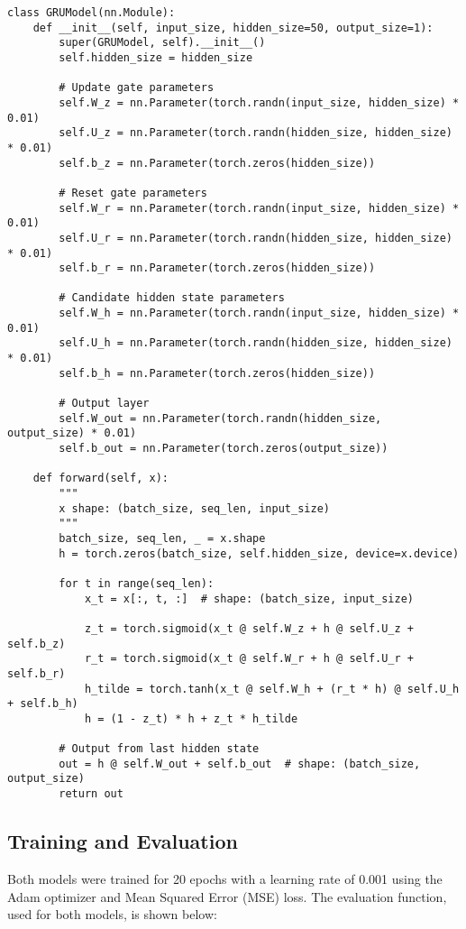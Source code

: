 \documentclass{article}
\begin{document}
\begin{lstlisting}
class GRUModel(nn.Module):
    def __init__(self, input_size, hidden_size=50, output_size=1):
        super(GRUModel, self).__init__()
        self.hidden_size = hidden_size

        # Update gate parameters
        self.W_z = nn.Parameter(torch.randn(input_size, hidden_size) * 0.01)
        self.U_z = nn.Parameter(torch.randn(hidden_size, hidden_size) * 0.01)
        self.b_z = nn.Parameter(torch.zeros(hidden_size))

        # Reset gate parameters
        self.W_r = nn.Parameter(torch.randn(input_size, hidden_size) * 0.01)
        self.U_r = nn.Parameter(torch.randn(hidden_size, hidden_size) * 0.01)
        self.b_r = nn.Parameter(torch.zeros(hidden_size))

        # Candidate hidden state parameters
        self.W_h = nn.Parameter(torch.randn(input_size, hidden_size) * 0.01)
        self.U_h = nn.Parameter(torch.randn(hidden_size, hidden_size) * 0.01)
        self.b_h = nn.Parameter(torch.zeros(hidden_size))

        # Output layer
        self.W_out = nn.Parameter(torch.randn(hidden_size, output_size) * 0.01)
        self.b_out = nn.Parameter(torch.zeros(output_size))

    def forward(self, x):
        """
        x shape: (batch_size, seq_len, input_size)
        """
        batch_size, seq_len, _ = x.shape
        h = torch.zeros(batch_size, self.hidden_size, device=x.device)

        for t in range(seq_len):
            x_t = x[:, t, :]  # shape: (batch_size, input_size)

            z_t = torch.sigmoid(x_t @ self.W_z + h @ self.U_z + self.b_z)
            r_t = torch.sigmoid(x_t @ self.W_r + h @ self.U_r + self.b_r)
            h_tilde = torch.tanh(x_t @ self.W_h + (r_t * h) @ self.U_h + self.b_h)
            h = (1 - z_t) * h + z_t * h_tilde

        # Output from last hidden state
        out = h @ self.W_out + self.b_out  # shape: (batch_size, output_size)
        return out
\end{lstlisting}

\subsection{Training and Evaluation}
Both models were trained for 20 epochs with a learning rate of 0.001 using the Adam optimizer and Mean Squared Error (MSE) loss. The evaluation function, used for both models, is shown below:
\end{document}
